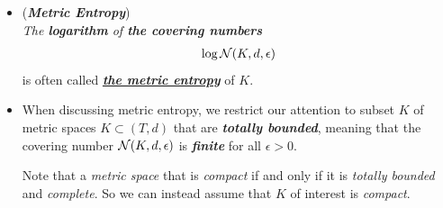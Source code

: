 \documentclass[11pt]{article}
\begin{document}
\begin{itemize}
\begin{proof}
To prove the lower bound, choose an $2\epsilon$-separated subset $\cP = \set{x_i}_i$ in $K$ and an $\epsilon$-net $\cN = \set{y_j}_j$ of $K$. By the definition of a net, each point $x_i$ belongs \emph{a closed $\epsilon$-ball centered at some point $y_j$}. Moreover, since any closed $\epsilon$-ball can not contain a pair of $2\epsilon$-separated points, \emph{each $\epsilon$-ball centered at $y_j$ may contain \textbf{at most one point} $x_i$}. The \emph{\textbf{pigeonhole principle}} then yields 
\begin{align*}
\abs{\cP} \le \abs{\cN}.
\end{align*}  Since this happens for arbitrary packing $\cP$ and covering $\cN$, the lower bound in the lemma is proved. \qed
\end{proof}

\item \begin{definition} (\textbf{\emph{Metric Entropy}}) \\
\emph{The \textbf{logarithm} of \textbf{the covering numbers}} 
\begin{align*}
\log {\mathcal N}(K, d, \epsilon)
\end{align*}  is often called \underline{\emph{\textbf{the metric entropy}}} of $K$.
\end{definition}

\item \begin{remark}
When discussing metric entropy, we restrict our attention to subset $K$ of metric spaces $K \subset (T, d)$ that are \emph{\textbf{totally bounded}}, meaning that the covering number ${\mathcal N}(K, d, \epsilon)$ is \emph{\textbf{finite}} for all $\epsilon > 0$. 

Note that  a \emph{metric space} that is \emph{compact} if and only if it is  \emph{totally bounded} and \emph{complete}. So we can instead assume that $K$ of interest is \emph{compact}.
\end{remark}
\end{itemize}
\end{document}
